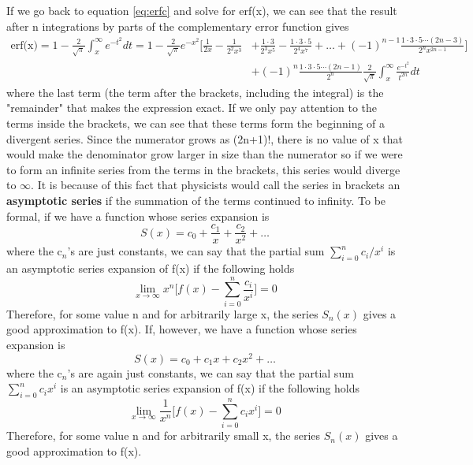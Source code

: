 \documentclass{article}
\newcommand{\be}{\begin{equation}}
\newcommand{\ee}{\end{equation}}
\begin{document}
If we go back to equation \ref{eq:erfc} and solve for erf(x), we can see that the result after n integrations by parts of the complementary error function gives
\be
  \begin{split}
    \text{erf(x)} = 1 - \frac{2}{\sqrt{\pi}} \int_x^{\infty} e^{-t^2} dt = 1 - \frac{2}{\sqrt{\pi}} e^{-x^2} \Big[ \frac{1}{2x} - \frac{1}{2^2 x^3} & + \frac{1 \cdot 3}{2^3 x^5} - \frac{1 \cdot 3 \cdot 5}{2^4 x^7} + \hdots + (-1)^{n-1} \frac{1 \cdot 3 \cdot 5 \cdots (2n-3)}{2^n x^{2n-1}} \Big] \\
    & + (-1)^n \frac{1 \cdot 3 \cdot 5 \cdots (2n-1)}{2^n} \frac{2}{\sqrt{\pi}} \int_x^{\infty} \frac{e^{-t^2}}{t^{2n}} dt
  \end{split}
\ee
where the last term (the term after the brackets, including the integral) is the "remainder" that makes the expression exact.
If we only pay attention to the terms inside the brackets, we can see that these terms form the beginning of a divergent series.
Since the numerator grows as (2n+1)!, there is no value of x that would make the denominator grow larger in size than the numerator so if we were to form an infinite series from the terms in the brackets, this series would diverge to $\infty$.
It is because of this fact that physicists would call the series in brackets an \textbf{asymptotic series} if the summation of the terms continued to infinity.
To be formal, if we have a function whose series expansion is
\be
S(x) = c_0 + \frac{c_1}{x} + \frac{c_2}{x^2} + \hdots
\ee
where the c$_n$'s are just constants, we can say that the partial sum $\sum\limits_{i=0}^n c_i / x^i$ is an asymptotic series expansion of f(x) if the following holds
\be
  \lim_{x \to \infty} x^n \Big[ f(x) - \sum_{i=0}^n \frac{c_i}{x^i} \Big] = 0
\ee
Therefore, for some value n and for arbitrarily large x, the series $S_n(x)$ gives a good approximation to f(x).
If, however, we have a function whose series expansion is
\be
  S(x) = c_0 + c_1x + c_2x^2 + \hdots
\ee
where the c$_n$'s are again just constants, we can say that the partial sum  $\sum\limits_{i=0}^n c_i x^i$ is an asymptotic series expansion of f(x) if the following holds
\be
  \lim_{x \to \infty} \frac{1}{x^n} \Big[ f(x) - \sum_{i=0}^n c_i x^i \Big] = 0
\ee
Therefore, for some value n and for arbitrarily small x, the series $S_n(x)$ gives a good approximation to f(x).
\end{document}
